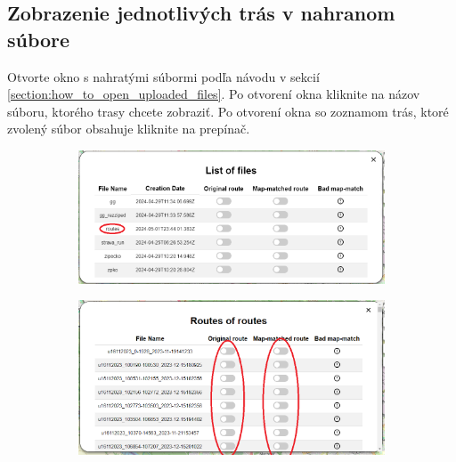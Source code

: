 \subsection{Zobrazenie jednotlivých trás v nahranom súbore}
Otvorte okno s nahratými súbormi podľa návodu v sekcií \ref{section:how_to_open_uploaded_files}. Po otvorení okna kliknite na názov súboru, ktorého trasy chcete zobraziť. Po otvorení okna so zoznamom trás, ktoré zvolený súbor obsahuje kliknite na prepínač.
\begin{figure}[H]
    \centering
    \begin{subfigure}{1\textwidth}
        \centering
        \includegraphics[width=1\textwidth]{guide_includes/img/open_file.png}
    \end{subfigure}
    \begin{subfigure}{1\textwidth}
        \centering
        \includegraphics[width=1\textwidth]{guide_includes/img/toggle_route.png}
    \end{subfigure}
\end{figure}


